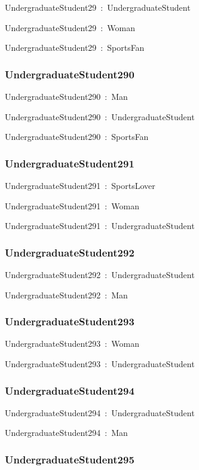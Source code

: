 \documentclass{article}
\begin{document}
UndergraduateStudent29~:~UndergraduateStudent

UndergraduateStudent29~:~Woman

UndergraduateStudent29~:~SportsFan

\subsubsection*{UndergraduateStudent290}

UndergraduateStudent290~:~Man

UndergraduateStudent290~:~UndergraduateStudent

UndergraduateStudent290~:~SportsFan

\subsubsection*{UndergraduateStudent291}

UndergraduateStudent291~:~SportsLover

UndergraduateStudent291~:~Woman

UndergraduateStudent291~:~UndergraduateStudent

\subsubsection*{UndergraduateStudent292}

UndergraduateStudent292~:~UndergraduateStudent

UndergraduateStudent292~:~Man

\subsubsection*{UndergraduateStudent293}

UndergraduateStudent293~:~Woman

UndergraduateStudent293~:~UndergraduateStudent

\subsubsection*{UndergraduateStudent294}

UndergraduateStudent294~:~UndergraduateStudent

UndergraduateStudent294~:~Man

\subsubsection*{UndergraduateStudent295}
\end{document}
